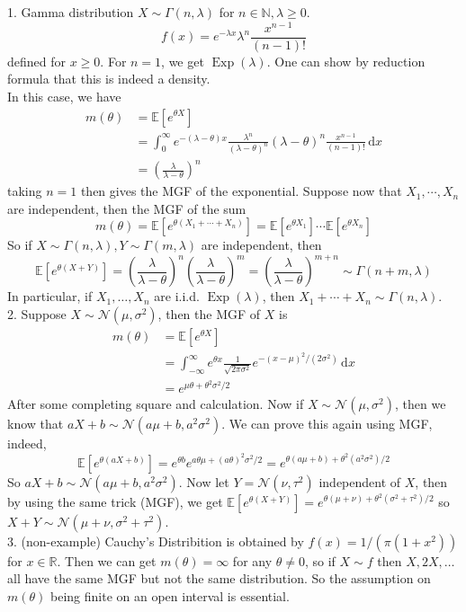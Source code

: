 \begin{example}
    1. Gamma distribution $X\sim\Gamma(n,\lambda)$ for $n\in\mathbb N,\lambda\ge 0$.
    $$f(x)=e^{-\lambda x}\lambda^n\frac{x^{n-1}}{(n-1)!}$$
    defined for $x\ge 0$.
    For $n=1$, we get $\operatorname{Exp}(\lambda)$.
    One can show by reduction formula that this is indeed a density.\\
    In this case, we have
    \begin{align*}
        m(\theta)&=\mathbb E[e^{\theta X}]\\
        &=\int_0^\infty e^{-(\lambda-\theta)x}\frac{\lambda^n}{(\lambda-\theta)^n}(\lambda-\theta)^n\frac{x^{n-1}}{(n-1)!}\,\mathrm dx\\
        &=\left(\frac{\lambda}{\lambda-\theta} \right)^n
    \end{align*}
    taking $n=1$ then gives the MGF of the exponential.
    Suppose now that $X_1,\cdots,X_n$ are independent, then the MGF of the sum
    $$m(\theta)=\mathbb E[e^{\theta(X_1+\cdots+X_n)}]=\mathbb E[e^{\theta X_1}]\cdots\mathbb E[e^{\theta X_n}]$$
    So if $X\sim\Gamma(n,\lambda),Y\sim\Gamma(m,\lambda)$ are independent, then
    $$\mathbb E[e^{\theta(X+Y)}]=\left(\frac{\lambda}{\lambda-\theta} \right)^n\left(\frac{\lambda}{\lambda-\theta} \right)^m=\left(\frac{\lambda}{\lambda-\theta} \right)^{m+n}\sim\Gamma(n+m,\lambda)$$
    In particular, if $X_1,\ldots,X_n$ are i.i.d. $\operatorname{Exp}(\lambda)$, then $X_1+\cdots+X_n\sim\Gamma(n,\lambda)$.\\
    2. Suppose $X\sim\mathcal N(\mu,\sigma^2)$, then the MGF of $X$ is
    \begin{align*}
        m(\theta)&=\mathbb E[e^{\theta X}]\\
        &=\int_{-\infty}^\infty e^{\theta x}\frac{1}{\sqrt{2\pi \sigma^2}}e^{-(x-\mu)^2/(2\sigma^2)}\,\mathrm dx\\
        &=e^{\mu\theta+\theta^2\sigma^2/2}
    \end{align*}
    After some completing square and calculation.
    Now if $X\sim\mathcal N(\mu,\sigma^2)$, then we know that $aX+b\sim\mathcal N(a\mu+b,a^2\sigma^2)$.
    We can prove this again using MGF, indeed,
    $$\mathbb E[e^{\theta(aX+b)}]=e^{\theta b}e^{a\theta\mu+(a\theta)^2\sigma^2/2}=e^{\theta(a\mu +b)+\theta^2(a^2\sigma^2)/2}$$
    So $aX+b\sim\mathcal N(a\mu+b,a^2\sigma^2)$.
    Now let $Y=\mathcal N(\nu,\tau^2)$ independent of $X$, then by using the same trick (MGF), we get $\mathbb E[e^{\theta(X+Y)}]=e^{\theta(\mu+\nu)+\theta^2(\sigma^2+\tau^2)/2}$ so $X+Y\sim\mathcal N(\mu+\nu,\sigma^2+\tau^2)$.\\
    3. (non-example) Cauchy's Distribition is obtained by $f(x)=1/(\pi(1+x^2))$ for $x\in\mathbb R$.
    Then we can get $m(\theta)=\infty$ for any $\theta\neq 0$, so if $X\sim f$ then $X,2X,\ldots$ all have the same MGF but not the same distribution.
    So the assumption on $m(\theta)$ being finite on an open interval is essential.
\end{example}
